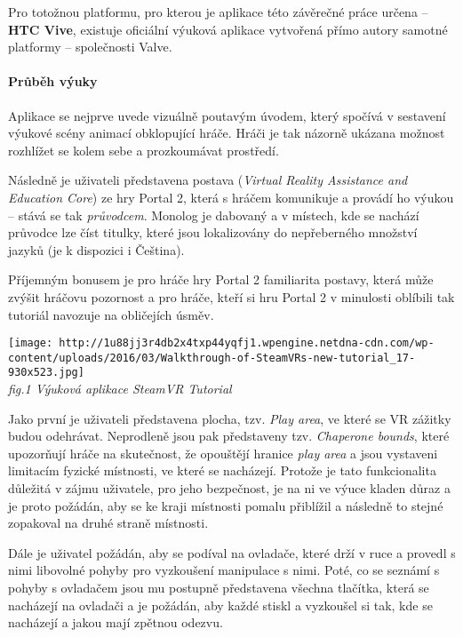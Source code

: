 Pro totožnou platformu, pro kterou je aplikace této závěrečné práce
určena -- \textbf{HTC Vive}, existuje oficiální výuková aplikace
vytvořená přímo autory samotné platformy -- společnosti Valve.

\paragraph{Průběh výuky}\label{prux16fbux11bh-vuxfduky}

Aplikace se nejprve uvede vizuálně poutavým úvodem, který spočívá v
sestavení výukové scény animací obklopující hráče. Hráči je tak názorně
ukázana možnost rozhlížet se kolem sebe a prozkoumávat prostředí.

Následně je uživateli představena postava (\emph{Virtual Reality
Assistance and Education Core}) ze hry Portal 2, která s hráčem
komunikuje a provádí ho výukou -- stává se tak \emph{průvodcem}. Monolog
je dabovaný a v místech, kde se nachází průvodce lze číst titulky, které
jsou lokalizovány do nepřeberného množství jazyků (je k dispozici i
Čeština).

Příjemným bonusem je pro hráče hry Portal 2 familiarita postavy, která
může zvýšit hráčovu pozornost a pro hráče, kteří si hru Portal 2 v
minulosti oblíbili tak tutoriál navozuje na obličejích úsměv.

\texttt{[image: http://1u88jj3r4db2x4txp44yqfj1.wpengine.netdna-cdn.com/wp-content/uploads/2016/03/Walkthrough-of-SteamVRs-new-tutorial\_17-930x523.jpg]}\\
\emph{fig.1 Výuková aplikace SteamVR Tutorial}

Jako první je uživateli představena plocha, tzv. \emph{Play area}, ve
které se VR zážitky budou odehrávat. Neprodleně jsou pak představeny
tzv. \emph{Chaperone bounds}, které upozorňují hráče na skutečnost, že
opouštějí hranice \emph{play area} a jsou vystaveni limitacím fyzické
místnosti, ve které se nacházejí. Protože je tato funkcionalita důležitá
v zájmu uživatele, pro jeho bezpečnost, je na ni ve výuce kladen důraz a
je proto požádán, aby se ke kraji místnosti pomalu přiblížil a následně
to stejné zopakoval na druhé straně místnosti.

Dále je uživatel požádán, aby se podíval na ovladače, které drží v ruce
a provedl s nimi libovolné pohyby pro vyzkoušení manipulace s nimi.
Poté, co se seznámí s pohyby s ovladačem jsou mu postupně představena
všechna tlačítka, která se nacházejí na ovladači a je požádán, aby každé
stiskl a vyzkoušel si tak, kde se nacházejí a jakou mají zpětnou odezvu.


